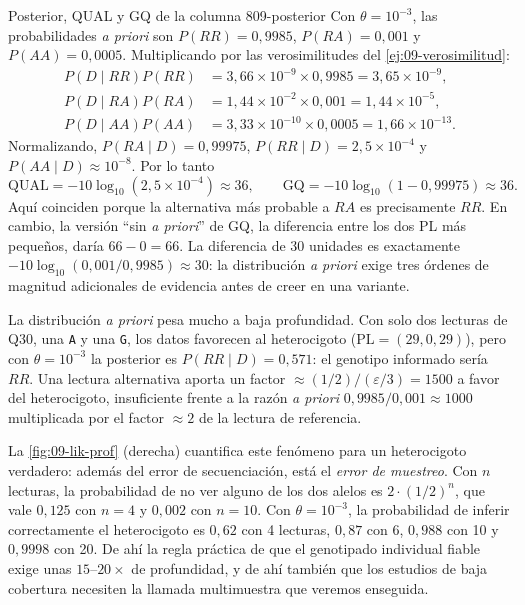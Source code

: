 \begin{ejemplo}{Posterior, QUAL y GQ de la columna 8}{09-posterior}
Con $\theta=10^{-3}$, las probabilidades \emph{a priori} son $P(RR)=0{,}9985$, $P(RA)=0{,}001$ y $P(AA)=0{,}0005$. Multiplicando por las verosimilitudes del \cref{ej:09-verosimilitud}:
\[
\begin{aligned}
P(D\mid RR)P(RR) &= 3{,}66\times10^{-9}\times0{,}9985 = 3{,}65\times10^{-9},\\
P(D\mid RA)P(RA) &= 1{,}44\times10^{-2}\times0{,}001 = 1{,}44\times10^{-5},\\
P(D\mid AA)P(AA) &= 3{,}33\times10^{-10}\times0{,}0005 = 1{,}66\times10^{-13}.
\end{aligned}
\]
Normalizando, $P(RA\mid D)=0{,}99975$, $P(RR\mid D)=2{,}5\times10^{-4}$ y $P(AA\mid D)\approx10^{-8}$. Por lo tanto
\[
\mathrm{QUAL} = -10\log_{10}(2{,}5\times10^{-4}) \approx 36,\qquad
\mathrm{GQ} = -10\log_{10}(1-0{,}99975)\approx 36.
\]
Aquí coinciden porque la alternativa más probable a $RA$ es precisamente $RR$. En cambio, la versión ``sin \emph{a priori}'' de GQ, la diferencia entre los dos PL más pequeños, daría $66-0=66$. La diferencia de 30 unidades es exactamente $-10\log_{10}(0{,}001/0{,}9985)\approx30$: la distribución \emph{a priori} exige tres órdenes de magnitud adicionales de evidencia antes de creer en una variante.
\end{ejemplo}

La distribución \emph{a priori} pesa mucho a baja profundidad. Con solo dos lecturas de Q30, una \texttt{A} y una \texttt{G}, los datos favorecen al heterocigoto ($\mathrm{PL}=(29,0,29)$), pero con $\theta=10^{-3}$ la posterior es $P(RR\mid D)=0{,}571$: el genotipo informado sería $RR$. Una lectura alternativa aporta un factor $\approx(1/2)/(\varepsilon/3)=1500$ a favor del heterocigoto, insuficiente frente a la razón \emph{a priori} $0{,}9985/0{,}001\approx1000$ multiplicada por el factor $\approx2$ de la lectura de referencia.

La \cref{fig:09-lik-prof} (derecha) cuantifica este fenómeno para un heterocigoto verdadero: además del error de secuenciación, está el \emph{error de muestreo}. Con $n$ lecturas, la probabilidad de no ver alguno de los dos alelos es $2\cdot(1/2)^n$, que vale $0{,}125$ con $n=4$ y $0{,}002$ con $n=10$. Con $\theta=10^{-3}$, la probabilidad de inferir correctamente el heterocigoto es $0{,}62$ con 4 lecturas, $0{,}87$ con 6, $0{,}988$ con 10 y $0{,}9998$ con 20. De ahí la regla práctica de que el genotipado individual fiable exige unas $15$--$20\times$ de profundidad, y de ahí también que los estudios de baja cobertura necesiten la llamada multimuestra que veremos enseguida.

